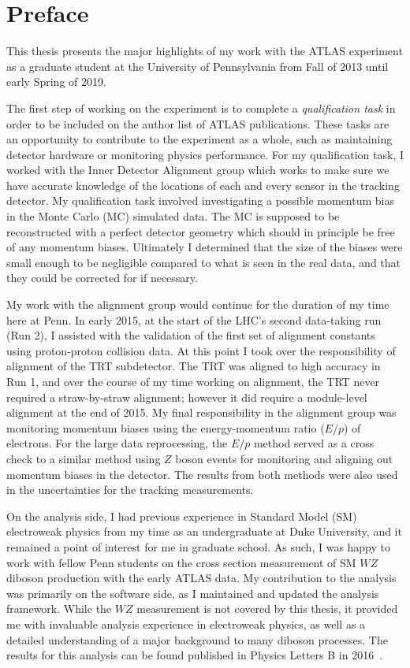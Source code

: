 \chapter{Preface}

This thesis presents the major highlights of my work with the ATLAS experiment as a graduate student at the University of Pennsylvania from Fall of 2013 until early Spring of 2019.

The first step of working on the experiment is to complete a \emph{qualification task} in order to be included on the author list of ATLAS publications.
These tasks are an opportunity to contribute to the experiment as a whole, such as maintaining detector hardware or monitoring physics performance.
For my qualification task, I worked with the Inner Detector Alignment group which works to make sure we have accurate knowledge of the locations of each and every sensor in the tracking detector.
My qualification task involved investigating a possible momentum bias in the Monte Carlo (MC) simulated data.
The MC is supposed to be reconstructed with a perfect detector geometry which should in principle be free of any momentum biases.
Ultimately I determined that the size of the biases were small enough to be negligible compared to what is seen in the real data, and that they could be corrected for if necessary.

My work with the alignment group would continue for the duration of my time here at Penn.
In early 2015, at the start of the LHC's second data-taking run (Run 2), I assisted with the validation of the first set of alignment constants using  proton-proton collision data.
At this point I took over the responsibility of alignment of the TRT subdetector.
The TRT was aligned to high accuracy in Run 1, and over the course of my time working on alignment, the TRT never required a straw-by-straw alignment; however it did require a module-level alignment at the end of 2015.
My final responsibility in the alignment group was monitoring momentum biases using the energy-momentum ratio ($E/p$) of electrons.
For the large data reprocessing, the $E/p$ method served as a cross check to a similar method using $Z$ boson events for monitoring and aligning out momentum biases in the detector.
The results from both methods were also used in the uncertainties for the tracking measurements.

On the analysis side, I had previous experience in Standard Model (SM) electroweak physics from my time as an undergraduate at Duke University, and it remained a point of interest for me in graduate school.
As such, I was happy to work with fellow Penn students on the cross section measurement of SM $WZ$ diboson production with the early  ATLAS data.
My contribution to the analysis was primarily on the software side, as I maintained and updated the analysis framework.
While the $WZ$ measurement is not covered by this thesis, it provided me with invaluable analysis experience in electroweak physics, as well as a detailed understanding of a major background to many diboson processes.
The results for this analysis can be found published in Physics Letters B in 2016~\cite{2016.wz-13tev-physlett}.

